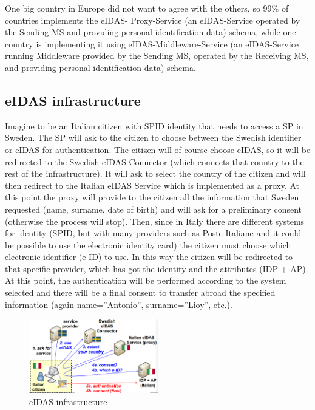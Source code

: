 One big country in Europe did not want to agree with the others, so
99\% of countries implements the eIDAS- Proxy-Service (an eIDAS-Service
operated by the Sending MS and providing personal identification data)
schema, while one country is implementing it using
eIDAS-Middleware-Service (an eIDAS-Service running Middleware provided
by the Sending MS, operated by the Receiving MS, and providing
personal identification data) schema.

\subsection{eIDAS infrastructure}
Imagine to be an Italian citizen with SPID identity that needs to
access a SP in Sweden. The SP will ask to the citizen to choose
between the Swedish identifier or eIDAS for authentication. The
citizen will of course choose eIDAS, so it will be redirected to the
Swedish eIDAS Connector (which connects that country to the rest of
the infrastructure). It will ask to select the country of the citizen
and will then redirect to the Italian eIDAS Service which is
implemented as a proxy. At this point the proxy will provide to the
citizen all the information that Sweden requested (name, surname, date
of birth) and will ask for a preliminary consent (otherwise the
process will stop). Then, since in Italy there are different systems
for identity (SPID, but with many providers such as Poste Italiane and
it could be possible to use the electronic identity card) the citizen
must choose which electronic identifier (e-ID) to use. In this way the
citizen will be redirected to that specific provider, which has got
the identity and the attributes (IDP + AP). At this point, the
authentication will be performed according to the system selected and
there will be a final consent to transfer abroad the specified
information (again name=”Antonio”, surname=”Lioy”, etc.).

\begin{figure}[H]
  \centering
  \includegraphics[width=0.5\textwidth]{img/eidas infrastructure.png}
  \caption{eIDAS infrastructure}
\end{figure}

